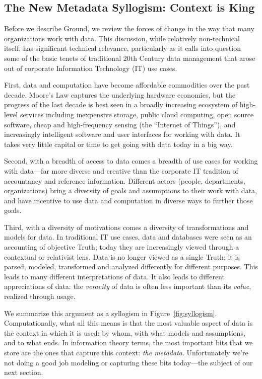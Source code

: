 \documentclass[10pt,letterpaper]{article}
\begin{document}
\subsection{The New Metadata Syllogism: Context is King}

Before we describe Ground, we review the forces of change in the way that many organizations work with data.  This discussion, while relatively non-technical itself, has significant technical relevance, particularly as it calls into question some of the basic tenets of traditional 20th Century data management that arose out of corporate Information Technology (IT) use cases.

First, data and computation have become affordable commodities over the past decade. Moore's Law captures the underlying hardware economics, but the progress of the last decade is best seen in a broadly increasing ecosystem of high-level services including inexpensive storage, public cloud computing, open source software, cheap and high-frequency sensing (the ``Internet of Things''), and increasingly intelligent software and user interfaces for working with data.  It takes very little capital or time to get going with data today in a big way.

Second, with a breadth of access to data comes a breadth of use cases for working with data---far more diverse and creative than the corporate IT tradition of accountancy and reference information.  Different actors (people, departments, organizations) bring a diversity of goals and assumptions to their work with data, and have incentive to use data and computation in diverse ways to further those goals.

Third, with a diversity of motivations comes a diversity of transformations and models for data.  In traditional IT use cases, data and databases were seen as an accounting of objective Truth; today they are increasingly viewed through a contextual or relativist lens.  Data is no longer viewed as a single Truth; it is parsed, modeled, transformed and analyzed differently for different purposes.  This leads to many different interpretations of data.  It also leads to different appreciations of data: the \emph{veracity} of data is often less important than its \emph{value}, realized through usage.

We summarize this argument as a syllogism in Figure~\ref{fig:syllogism}.  Computationally, what all this means is that the most valuable aspect of data is the context in which it is used: by whom, with what models and assumptions, and to what ends.  In information theory terms, the most important bits that we store are the ones that capture this context: \emph{the metadata}.  Unfortunately we're not doing a good job modeling or capturing these bits today---the subject of our next section.
\end{document}
